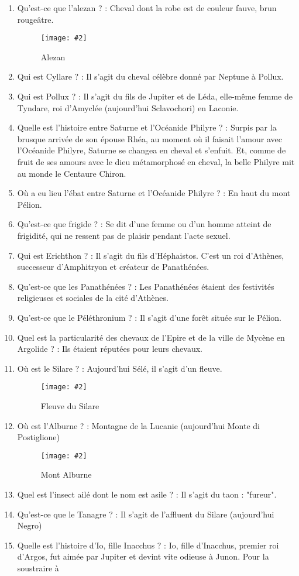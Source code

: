 \documentclass[a4paper, 11pt, hidelinks]{article}
\newcommand{\img}[4]{\begin{figure}[!ht]
    \centering
    \texttt{[image: \#2]}
    \caption{#3}
    \label{#4}
    \end{figure} }
\begin{document}
\begin{enumerate}
            \img{0.5}{Bai.jpg}{Bai}{117}
      \item Qu'est-ce que l'alezan ? : Cheval dont la robe est de couleur fauve, brun rougeâtre.
            \img{0.5}{Alezan.jpg}{Alezan}{118}
      \item Qui est Cyllare ? : Il s'agit du cheval célèbre donné par Neptune à Pollux.
      \item Qui est Pollux ? : Il s'agit du fils de Jupiter et de Léda, elle-même femme de Tyndare, roi d'Amyclée (aujourd'hui Sclavochori) en Laconie.
      \item Quelle est l'histoire entre Saturne et l'Océanide Philyre ? : Surpis par la brusque arrivée de son épouse Rhéa, au moment où il faisait l'amour avec l'Océanide Philyre, 
            Saturne se changea en cheval et s'enfuit. Et, comme de fruit de ses amours avec le dieu métamorphosé en cheval, la belle Philyre mit au monde le Centaure Chiron.
      \item Où a eu lieu l'ébat entre Saturne et l'Océanide Philyre ? : En haut du mont Pélion.
      \item Qu'est-ce que frigide ? : Se dit d'une femme ou d'un homme atteint de frigidité, qui ne ressent pas de plaisir pendant l'acte sexuel.
      \item Qui est Erichthon ? : Il s'agit du fils d'Héphaistos. C'est un roi d'Athènes, successeur d'Amphitryon et créateur de Panathénées.
      \item Qu'est-ce que les Panathénées ? : Les Panathénées étaient des festivités religieuses et sociales de la cité d'Athènes.
      \item Qu'est-ce que le Péléthronium ? : Il s'agit d'une forêt située sur le Pélion.
      \item Quel est la particularité des chevaux de l'Epire et de la ville de Mycène en Argolide ? : Ils étaient réputées pour leurs chevaux.
      \item Où est le Silare ? : Aujourd'hui Sélé, il s'agit d'un fleuve.
            \img{0.4}{Sélé.png}{Fleuve du Silare}{119}
      \item Où est l'Alburne ? : Montagne de la Lucanie (aujourd'hui Monte di Postiglione)
            \img{0.5}{Alburne.png}{Mont Alburne}{120}
      \item Quel est l'insect ailé dont le nom est asile ? : Il s'agit du taon : "fureur".
      \item Qu'est-ce que le Tanagre ? : Il s'agit de l'affluent du Silare (aujourd'hui Negro)
      \item Quelle est l'histoire d'Io, fille Inacchus ? : Io, fille d'Inacchus, premier roi d'Argos, fut aimée par Jupiter et devint vite odieuse à Junon. Pour la soustraire à

\end{enumerate}
\end{document}
